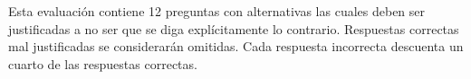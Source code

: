 \vspace{0.05\textwidth}

Esta evaluaci\'on contiene 12 preguntas con alternativas las cuales deben ser justificadas a no ser que se diga expl\'icitamente lo contrario. Respuestas correctas mal justificadas se considerar\'an omitidas. Cada respuesta incorrecta descuenta un cuarto de las respuestas correctas.